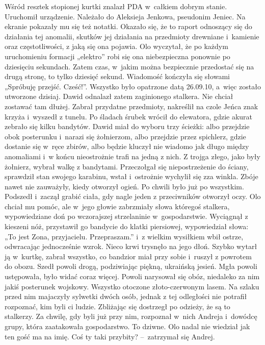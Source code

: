 \documentclass[../MAIN.tex]{subfiles}
\begin{document}
\pp
Wśród resztek stopionej kurtki znalazł PDA w~całkiem dobrym stanie. Uruchomił urządzenie. Należało do Aleksieja Jenkowa, pseudonim Jeniec. Na ekranie pokazały mu się też notatki. Okazało się, że to raport odnoszący się do działania tej anomalii, skutków jej działania na przedmioty drewniane i~kamienie oraz częstotliwości, z jaką się ona pojawia. Olo wyczytał, że po każdym uruchomieniu formacji „elektro” robi się ona niebezpieczna ponownie po dziesięciu sekundach. Zatem czas, w~jakim można bezpiecznie przedostać się na drugą stronę, to tylko dziesięć sekund. Wiadomość kończyła się słowami „Spróbuję przejść. Cześć!”. Wszystko było opatrzone datą 26.09.10, a~więc zostało utworzone dzisiaj. Dawid odnalazł zatem zaginionego stalkera.
\pp
Nie chciał zostawać tam dłużej. Zabrał przydatne przedmioty, nakreślił na czole Jeńca znak krzyża i~wyszedł z tunelu. Po śladach śrubek wrócił do elewatora, gdzie akurat zebrało się kilku bandytów. Dawid miał do wyboru trzy ścieżki: albo przejdzie obok posterunku i~narazi się żołnierzom, albo przejdzie przez spichlerz, gdzie dostanie się w~ręce zbirów, albo będzie kluczył nie wiadomo jak długo między anomaliami i~w końcu nieostrożnie trafi na jedną z nich. Z trojga złego, jako były żołnierz, wybrał walkę z bandytami. Przeczołgał się niepostrzeżenie do ściany, sprawdził stan swojego karabinu, wstał i~ostrożnie wychylił się zza winkla. Zbóje nawet nie zauważyły, kiedy otworzył ogień. Po chwili było już po wszystkim. Podszedł i~zaczął grabić ciała, gdy nagle jeden z przeciwników otworzył oczy. Olo chciał mu pomóc, ale w~jego głowie zabrzmiały słowa któregoś stalkera, wypowiedziane doń po wczorajszej strzelaninie w~gospodarstwie. Wyciągnął z kieszeni nóż, przystawił go bandycie do klatki piersiowej,
wypowiedział słowa: „To jest Zona, przyjacielu. Przepraszam.” i~z wielkim wysiłkiem wbił ostrze, odwracając jednocześnie wzrok. Nieco krwi trysnęło na jego dłoń. Szybko wytarł ją w~kurtkę, zabrał wszystko, co bandzior miał przy sobie i~ruszył z powrotem do obozu.
\pp
Szedł powoli drogą, podziwiając piękną, ukraińską jesień. Mgła powoli ustępowała, było widać coraz więcej. Powoli narysował się obóz, niedaleko za nim jakiś posterunek wojskowy. Wszystko otoczone złoto-czerwonym lasem. Na szlaku przed nim majaczyły sylwetki dwóch osób, jednak z tej odległości nie potrafił rozpoznać, kim byli ci ludzie. Zbliżając się dostrzegł po odzieży, że są to stalkerzy. Za chwilę, gdy byli już przy nim, rozpoznał w~nich Andreja i~dowódcę grupy, która zaatakowała gospodarstwo. To dziwne. Olo nadal nie wiedział jak ten gość ma na imię.
\pp
\sd
\xx Coś ty taki przybity? --~zatrzymał się Andrej.
\end{document}

